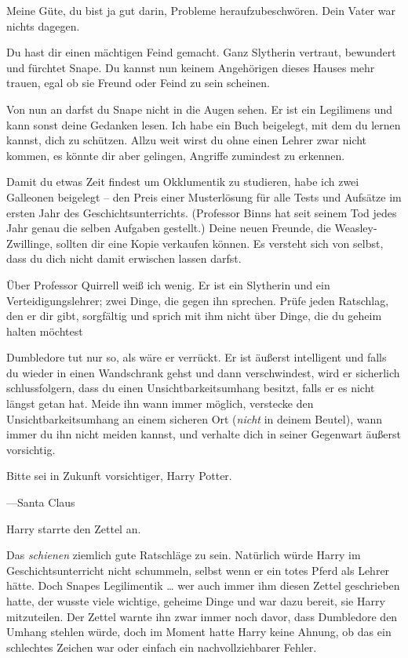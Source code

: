 \begin{writtenNote}
Meine Güte, du bist ja gut darin, Probleme heraufzubeschwören. Dein Vater war nichts dagegen. 

Du hast dir einen mächtigen Feind gemacht. Ganz Slytherin vertraut, bewundert und fürchtet Snape. Du kannst nun keinem Angehörigen dieses Hauses mehr trauen, egal ob sie Freund oder Feind zu sein scheinen. 

Von nun an darfst du Snape nicht in die Augen sehen. Er ist ein Legilimens und kann sonst deine Gedanken lesen. Ich habe ein Buch beigelegt, mit dem du lernen kannst, dich zu schützen. Allzu weit wirst du ohne einen Lehrer zwar nicht kommen, es könnte dir aber gelingen, Angriffe zumindest zu erkennen. 

Damit du etwas Zeit findest um Okklumentik zu studieren, habe ich zwei Galleonen beigelegt – den Preis einer Musterlösung für alle Tests und Aufsätze im ersten Jahr des Geschichtsunterrichts. (Professor Binns hat seit seinem Tod jedes Jahr genau die selben Aufgaben gestellt.) Deine neuen Freunde, die Weasley-Zwillinge, sollten dir eine Kopie verkaufen können. Es versteht sich von selbst, dass du dich nicht damit erwischen lassen darfst. 

Über Professor Quirrell weiß ich wenig. Er ist ein Slytherin und ein Verteidigungslehrer; zwei Dinge, die gegen ihn sprechen. Prüfe jeden Ratschlag, den er dir gibt, sorgfältig und sprich mit ihm nicht über Dinge, die du geheim halten möchtest 

Dumbledore tut nur so, als wäre er verrückt. Er ist äußerst intelligent und falls du wieder in einen Wandschrank gehst und dann verschwindest, wird er sicherlich schlussfolgern, dass du einen Unsichtbarkeitsumhang besitzt, falls er es nicht längst getan hat. Meide ihn wann immer möglich, verstecke den Unsichtbarkeitsumhang an einem sicheren Ort (\emph{nicht} in deinem Beutel), wann immer du ihn nicht meiden kannst, und verhalte dich in seiner Gegenwart äußerst vorsichtig. 

Bitte sei in Zukunft vorsichtiger, Harry Potter. 

—Santa Claus
\end{writtenNote}

Harry starrte den Zettel an. 

Das \emph{schienen} ziemlich gute Ratschläge zu sein. Natürlich würde Harry im Geschichtsunterricht nicht schummeln, selbst wenn er ein totes Pferd als Lehrer hätte. Doch Snapes Legilimentik … wer auch immer ihm diesen Zettel geschrieben hatte, der wusste viele wichtige, geheime Dinge und war dazu bereit, sie Harry mitzuteilen. Der Zettel warnte ihn zwar immer noch davor, dass Dumbledore den Umhang stehlen würde, doch im Moment hatte Harry keine Ahnung, ob das ein schlechtes Zeichen war oder einfach ein nachvollziehbarer Fehler. 

